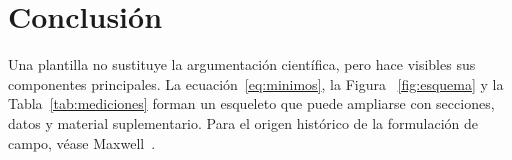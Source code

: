 \documentclass[a4paper,11pt]{article}
\begin{document}
\section{Conclusión}
Una plantilla no sustituye la argumentación científica, pero hace visibles sus
componentes principales. La ecuación~\eqref{eq:minimos}, la Figura
~\ref{fig:esquema} y la Tabla~\ref{tab:mediciones} forman un esqueleto que
puede ampliarse con secciones, datos y material suplementario. Para el origen
histórico de la formulación de campo, véase Maxwell~\cite{maxwell1865}.

\begingroup
\small


\endgroup
\end{document}
